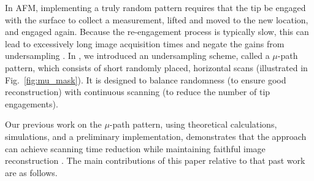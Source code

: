 \documentclass[journal]{IEEEtran}
\begin{document}
In AFM, implementing a truly random pattern requires that the tip be
engaged with the surface to collect a measurement, lifted and moved to
the new location, and engaged again.
Because the re-engagement process
is typically slow, this can lead to excessively long image acquisition
times and negate the gains from undersampling \cite{andersson2012non}.
In \cite{maxwell2014compressed}, we introduced an undersampling scheme,
called a $\mu$-path pattern, which consists of short randomly placed,
horizontal scans (illustrated in Fig.~\ref{fig:mu_mask}). It
is designed to balance randomness (to ensure good
reconstruction) with continuous scanning (to reduce the number of tip
engagements).

Our previous work on the $\mu$-path pattern, using theoretical
calculations, simulations, and a preliminary implementation,
demonstrates that the approach can achieve scanning time
reduction while maintaining faithful image reconstruction
\cite{maxwell2014compressed,Luo:2015tu, braker_hardware_2018}. 
The main contributions of this paper relative to that past work are as follows.
\end{document}
